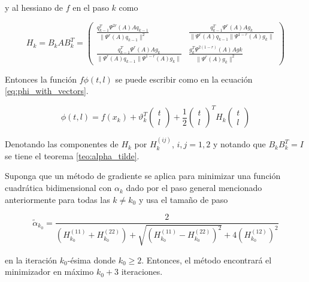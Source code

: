 y al hessiano de $f$ en el paso $k$ como

\begin{equation}
    H_k = B_kAB_k^T =\begin{pmatrix}
        \frac{q_{k-1}^T\Psi^{2r}(A)Aq_{k-1}}{\|\Psi^{r}(A)q_{k-1}\|^2}             & \frac{q_{k-1}^T\Psi^r(A)Ag_{k}}{\|\Psi^{r}(A)q_{k-1}\|\Psi^{1-r}(A)g_k\| } \\
        \frac{q_{k-1}^T\Psi^r(A)Ag_{k}}{\|\Psi^{r}(A)q_{k-1}\|\Psi^{1-r}(A)g_k\| } &
        \frac{g_k^T\Psi^{2(1-r)}(A)Ag{k}}{\|\Psi^{r}(A)g_k\|^2}
    \end{pmatrix} \label{eq:hk_bkabk}
\end{equation}

Entonces la función $f\phi(t, l)$ se puede escribir como en la ecuación \ref{eq:phi_with_vectors}.

\begin{equation}
    \phi(t, l) =  f(x_k)+\vartheta_k^T
    \begin{pmatrix}
        t \\l
    \end{pmatrix} +\frac{1}{2}
    \begin{pmatrix}
        t \\l
    \end{pmatrix}^T
    H_k
    \begin{pmatrix}
        t \\l
    \end{pmatrix} \label{eq:phi_with_vectors}
\end{equation}


Denotando las componentes de $H_k$ por $H_k^(ij)$, $i,j = 1,2$ y notando que $B_kB^T_k = I$ se tiene el teorema \ref{teo:alpha_tilde}.

\begin{teor}

    Suponga que un método de gradiente se aplica para minimizar una función cuadrá\-tica bidimensional con $\alpha_k$ dado por el paso general mencionado anteriormente para todas las $k\neq k_0$ y usa el tamaño de paso

    \begin{equation*}
        \tilde{\alpha}_{k_0} = \frac{2}{\left(H^{(11)}_{k_0} + H^{(22)}_{k_0}\right)+\sqrt{\left(H^{(11)}_{k_0} - H^{(22)}_{k_0}\right)^2 } + 4\left(H_{k_0}^{(12)}\right)^2}
    \end{equation*}

    en la iteración $k_0$-ésima donde $k_0\geq 2$. Entonces, el método encontrará el minimizador en máximo $k_0+3$ iteraciones.
    \label{teo:alpha_tilde}
\end{teor}


